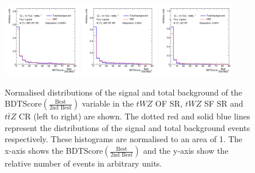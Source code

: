 \begin{figure}[h!]
    \centering
    \includegraphics[width=0.3\textwidth]{figures/bdtPlots/lep4_tWZ_4T_OF_BDT_Score_bestOver2ndBest_noExclusion.png}
    \includegraphics[width=0.3\textwidth]{figures/bdtPlots/lep4_tWZ_4T_SF_BDT_Score_bestOver2ndBest_noExclusion.png}
    \includegraphics[width=0.3\textwidth]{figures/bdtPlots/lep4_ttZ_4T_BDT_Score_bestOver2ndBest_noExclusion.png}
    \caption{Normalised distributions of the signal and total background of the BDTScore$(\frac{\text{Best}}{\text{2nd Best}})$ variable in the $tWZ$ OF SR, $tWZ$ SF SR and $t\bar{t}Z$ CR (left to right) are shown. The dotted red and solid blue lines represent the distributions of the signal and total background events respectively. These histograms are normalised to an area of 1. The x-axis shows the BDTScore$(\frac{\text{Best}}{\text{2nd Best}})$ and the y-axis show the relative number of events in arbitrary units.}
    \label{fig:bdtscore-bestover2ndbest}

\end{figure}
